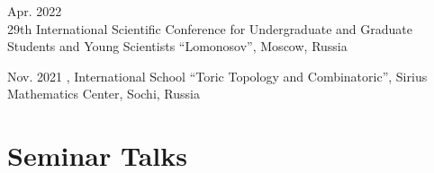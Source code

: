 \documentclass[11pt,letterpaper]{report}
\begin{document}
\begin{tablist}
       \item{Apr. 2022} \\ 29th International Scientific Conference for Undergraduate and Graduate Students and Young Scientists ``Lomonosov'', Moscow, Russia
       
         \item{Nov. 2021} , International School
``Toric Topology and Combinatoric'', Sirius Mathematics Center, Sochi, Russia
          
    \end{tablist}
    
    
    
    
    
    \section*{Seminar Talks}
      
\end{document}
